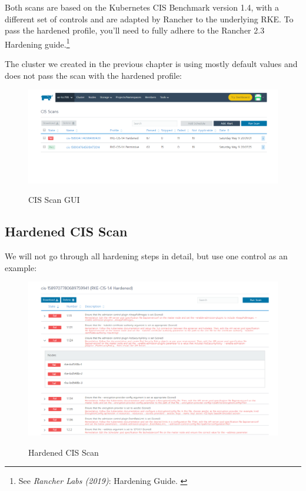 Both scans are based on the Kubernetes CIS Benchmark version 1.4, with a different set of controls and are adapted by Rancher to the underlying RKE. To pass the hardened profile, you'll need to fully adhere to the Rancher 2.3 Hardening guide.\footnote{See \textit{Rancher Labs (2019)}: Hardening Guide. \cite{hardeningGuide}}

The cluster we created in the previous chapter is using mostly default values and does not pass the scan with the hardened profile:

\begin{figure}[H]
\centering
\caption {CIS Scan GUI}
\includegraphics[width=\linewidth]{images/cis-scan-overview.png}
\label{fig:cisScanOverview}
\end{figure}

\subsection{Hardened CIS Scan}

We will not go through all hardening steps in detail, but use one control as an example:

\begin{figure}[H]
\centering
\caption {Hardened CIS Scan}
\includegraphics[width=\linewidth]{images/cis-scan-fail.png}
\label{fig:cisScanFail}
\end{figure}

